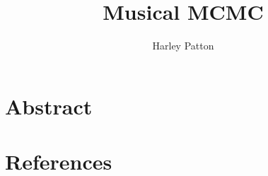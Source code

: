 \documentclass[12pt]{article}
\title{Musical MCMC}
\author{Harley Patton} %
\begin{document}
\maketitle

\section{Abstract}

\section{References}
\end{document}
